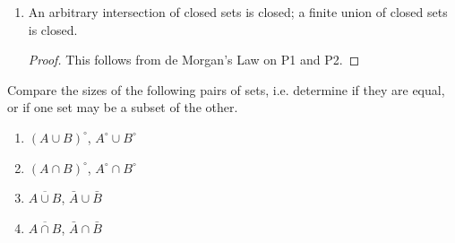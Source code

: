\begin{enumerate}[label=\textbf{P\arabic*}]
\begin{proof}
Let $A$ be an arbitrary union of open sets $\{U_i\}_{i \in I}$.

Then for any $x \in A$, suppose that $x \in U_i$, then since $U_i$ is open we can pick $B(x,\epsilon)$ subset of $U_i$ subset of $A$

On the other hand, let $U$ and $V$ be open sets and let $x \in U \cap V$. 
Since $U$ and $V$ are open, we can pick $\epsilon_1$ and $\epsilon_2$ such that $B(x,\epsilon_1)$ is in $U$ whereas $B(x,\epsilon_2)$ is in $V$. 
Then we simply pick $\epsilon=\min\{\epsilon_1,\epsilon_2\}$ so that $B(x,\epsilon)$ is in $U \cap V$.
\end{proof}

\item An arbitrary intersection of closed sets is closed; a finite union of closed sets is closed.

\begin{proof}
This follows from de Morgan's Law on P1 and P2.
\end{proof}
\end{enumerate}

\begin{prbm}\label{sizes}
Compare the sizes of the following pairs of sets, i.e. determine if they are equal, or if one set may be a subset of the other.
\begin{enumerate}
\item $(A\cup B)^\circ$, $A^\circ\cup B^\circ$
\item $(A\cap B)^\circ$, $A^\circ\cap B^\circ$
\item \label{size} $\overline{A\cup B}$, $\bar{A}\cup\bar{B}$
\item $\overline{A\cap B}$, $\bar{A}\cap\bar{B}$
\end{enumerate}
\end{prbm}

